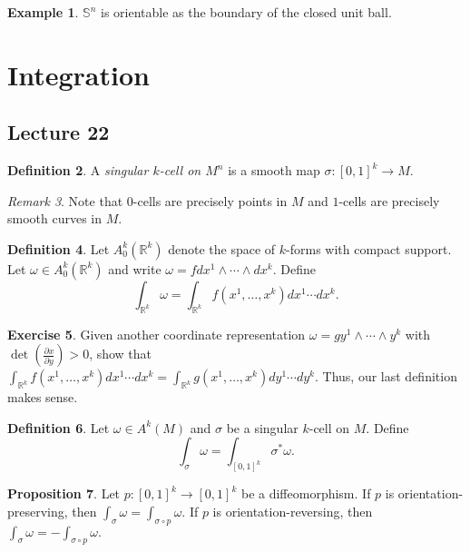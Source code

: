 \documentclass[10pt,letterpaper,cm]{nupset}
\theoremstyle{definition}
\newtheorem{definition}{Definition}[subsection]
\newtheorem{exmp}[definition]{Example}
\theoremstyle{theorem}
\newtheorem{prop}[definition]{Proposition}
\newtheorem{exercise}[definition]{Exercise}
\theoremstyle{remark}
\newtheorem{remark}[definition]{Remark}
\newcommand{\R}{\mathbb R}
\renewcommand{\S}{\mathbb S}
\newcommand{\1}{\mathbf{1}}
\newcommand{\0}{\vec 0}
\begin{document}
\begin{exmp}
$\S^n$ is orientable as the boundary of the closed unit ball.
\end{exmp}

\section{Integration}

\subsection{Lecture 22}

\begin{definition}
A \textit{singular $k$-cell on $M^n$} is a smooth map $\sigma : [0,1]^k \to M$.
\end{definition}

\begin{remark}
Note that $0$-cells are precisely points in $M$ and $1$-cells are precisely smooth curves in $M$.
\end{remark}

\begin{definition}
Let $A_0^k(\R^k)$ denote the space of $k$-forms with compact support. Let $\omega \in A_0^k(\R^k)$ and write $\omega = fdx^1\wedge \cdots \wedge dx^k$. Define $$ \int_{\R^k}\omega = \int_{\R^k} f(x^1, \ldots, x^k)dx^1\cdots dx^k  .$$
\end{definition}

\begin{exercise}
Given another coordinate representation $\omega = gy^1 \wedge \cdots \wedge y^k$ with $\det(\frac{\partial{x}}{\partial{y}}) >0$, show that $\int_{\R^k} f(x^1, \ldots, x^k)dx^1\cdots dx^k  = \int_{\R^k} g(x^1, \ldots, x^k)dy^1\cdots dy^k.$ Thus, our last definition makes sense.
\end{exercise}

\begin{definition}
Let $\omega \in A^k(M)$ and $\sigma$ be a singular $k$-cell on $M$. Define $$ \int_{\sigma} \omega = \int_{[0,1]^k}\sigma^{\ast}\omega  .$$
\end{definition}

\begin{prop}\label{preserve}
Let $p: [0,1]^k \to [0,1]^k$ be a diffeomorphism. If $p$ is orientation-preserving, then $\int_{\sigma} \omega = \int_{\sigma \circ p} \omega$. If $p$ is orientation-reversing, then $\int_{\sigma} \omega = -\int_{\sigma \circ p} \omega.$
\end{prop}
\end{document}
